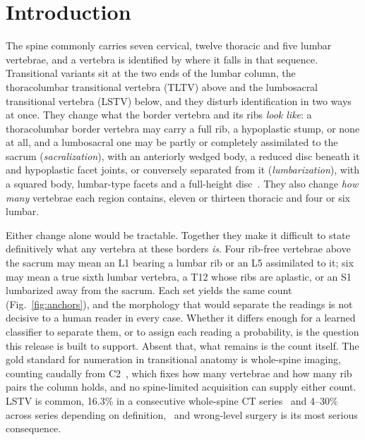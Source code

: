 \documentclass[aapm,mph,amsmath,amssymb,reprint]{revtex4-2}
\begin{document}
\maketitle

\section{Introduction}

The spine commonly carries seven cervical, twelve thoracic and five lumbar vertebrae, and a
vertebra is identified by where it falls in that sequence. Transitional variants sit at the
two ends of the lumbar column, the thoracolumbar transitional vertebra (TLTV) above and the
lumbosacral transitional vertebra (LSTV) below, and they disturb identification in two ways at once. They change what the border vertebra
and its ribs \emph{look like}: a thoracolumbar border vertebra may carry a full rib, a hypoplastic stump, or none at all, and
a lumbosacral one may be partly or completely assimilated to the sacrum
(\emph{sacralization}), with an anteriorly wedged body, a reduced disc beneath it and
hypoplastic facet joints, or conversely separated from it (\emph{lumbarization}), with a
squared body, lumbar-type facets and a full-height disc~\cite{koninwalz2010}. They also
change \emph{how many} vertebrae each region contains, eleven or thirteen thoracic and four or six lumbar.

Either change alone would be tractable. Together they make it difficult to state definitively
what any vertebra at these borders \emph{is}. Four rib-free vertebrae above the sacrum may mean
an L1 bearing a lumbar rib or an L5 assimilated to it; six may mean a true sixth lumbar
vertebra, a T12 whose ribs are aplastic, or an S1 lumbarized away from the sacrum. Each set yields the same count (Fig.~\ref{fig:anchors}), and the morphology that would
separate the readings is not decisive to a human reader in every case. Whether it differs
enough for a learned classifier to separate them, or to assign each reading a probability,
is the question this release is built to support. Absent that, what remains is the count
itself. The gold standard for numeration in
transitional anatomy is whole-spine imaging, counting caudally from C2~\cite{lian2018},
which fixes how many vertebrae and how many rib pairs the column holds, and no
spine-limited acquisition can supply either count. LSTV is common, 16.3\%
in a consecutive whole-spine CT series~\cite{nagata2025} and 4--30\% across series
depending on definition,~\cite{koninwalz2010,lian2018} and wrong-level surgery is its most
serious consequence.
\end{document}
